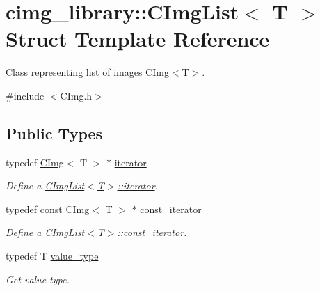 \hypertarget{structcimg__library_1_1_c_img_list}{\section{cimg\-\_\-library\-:\-:C\-Img\-List$<$ T $>$ Struct Template Reference}
\label{structcimg__library_1_1_c_img_list}
}


Class representing list of images C\-Img$<$\-T$>$.  




{\ttfamily \#include $<$C\-Img.\-h$>$}

\subsection*{Public Types}
\begin{DoxyCompactItemize}
\item 
\hypertarget{structcimg__library_1_1_c_img_list_ac4e7d5d973678ecd8250aa7eff9b9c98}{typedef \hyperlink{structcimg__library_1_1_c_img}{C\-Img}$<$ T $>$ $\ast$ \hyperlink{structcimg__library_1_1_c_img_list_ac4e7d5d973678ecd8250aa7eff9b9c98}{iterator}}\label{structcimg__library_1_1_c_img_list_ac4e7d5d973678ecd8250aa7eff9b9c98}

\begin{DoxyCompactList}\small\item\em Define a \hyperlink{structcimg__library_1_1_c_img_list_ac4e7d5d973678ecd8250aa7eff9b9c98}{C\-Img\-List$<$\-T$>$\-::iterator}. \end{DoxyCompactList}\item 
\hypertarget{structcimg__library_1_1_c_img_list_a9f452dd491a85506dbaca5ea32a636e3}{typedef const \hyperlink{structcimg__library_1_1_c_img}{C\-Img}$<$ T $>$ $\ast$ \hyperlink{structcimg__library_1_1_c_img_list_a9f452dd491a85506dbaca5ea32a636e3}{const\-\_\-iterator}}\label{structcimg__library_1_1_c_img_list_a9f452dd491a85506dbaca5ea32a636e3}

\begin{DoxyCompactList}\small\item\em Define a \hyperlink{structcimg__library_1_1_c_img_list_a9f452dd491a85506dbaca5ea32a636e3}{C\-Img\-List$<$\-T$>$\-::const\-\_\-iterator}. \end{DoxyCompactList}\item 
\hypertarget{structcimg__library_1_1_c_img_list_ab3c229d5b1ee47f7c71cb1499b29e4e4}{typedef T \hyperlink{structcimg__library_1_1_c_img_list_ab3c229d5b1ee47f7c71cb1499b29e4e4}{value\-\_\-type}}\label{structcimg__library_1_1_c_img_list_ab3c229d5b1ee47f7c71cb1499b29e4e4}

\begin{DoxyCompactList}\small\item\em Get value type. \end{DoxyCompactList}\end{DoxyCompactItemize}
